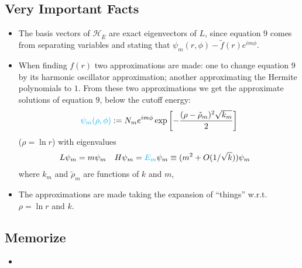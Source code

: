 \documentclass{article}
\newcommand{\cut}[1]{\overline{#1}}
\begin{document}
\subsection*{Very Important Facts}

    \begin{itemize}

    \item The basis vectors of $\mathcal H_{\cut E}$ are exact eigenvectors of $L$, since equation $9$ comes from separating variables and stating that $\psi_m (r, \phi) - \tilde f(r) e^{im\phi}$.
    
    \item When finding $f(r)$ two approximations are made: one to change equation $9$ by its harmonic oscillator approximation; another approximating the Hermite polynomials to $1$. From these two approximations we get the approximate solutions of equation $9$, below the cutoff energy:
        \begin{equation}
            \lbtext{\psi_m(\rho, \phi)} := N_m e^{im \phi} \exp{\left[ -\frac{(\rho - \tilde \rho_m)^2 \sqrt{k_m}}{2} \right]}
        \end{equation}
        ($\rho = \ln r$) with eigenvalues
        \begin{align}
            L \psi_m &= m \psi_m & H \psi_m &= \textcolor{cyan}{E_m} \psi_m \equiv (m^2 + O(1/\sqrt{k})) \psi_m
        \end{align}
        where $k_m$ and $\tilde \rho_m$ are functions of $k$ and $m$,
    
    \item The approximations are made taking the expansion of ``things'' w.r.t. $\rho = \ln r$ and $k$.
    
    \end{itemize}



\subsection*{Memorize}

    \begin{itemize}

    \item 
    
    \end{itemize}

\end{document}
